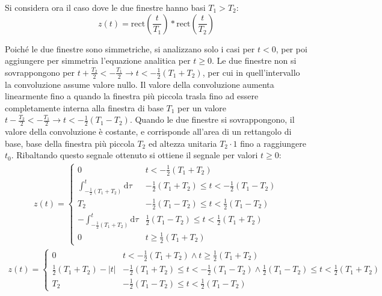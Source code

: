 \documentclass{article}
\newcommand{\rect}{\mathrm{rect}}
\newcommand{\df}{\mathrm{d}}
\begin{document}
Si considera ora il caso dove le due finestre hanno basi $T_1>T_2$:
\begin{equation*}
    z(t)=\rect\left(\displaystyle\frac{t}{T_1}\right)*\rect\left(\frac{t}{T_2}\right)
\end{equation*}

Poiché le due finestre sono simmetriche, si analizzano solo i casi per $t<0$, per poi aggiungere per simmetria l'equazione analitica per $t\geq0$. Le due finestre non si 
sovrappongono per $t+\displaystyle\frac{T_2}{2}<-\frac{T_1}{2}\to t<-\frac{1}{2}(T_1+T_2)$, per cui in quell'intervallo la convoluzione assume valore nullo. Il valore 
della convoluzione aumenta linearmente fino a quando la finestra più piccola trasla fino ad essere completamente interna alla finestra di base $T_1$ per un valore 
$t-\displaystyle\frac{T_2}{2}<-\frac{T_1}{2}\to t<-\frac{1}{2}(T_1-T_2)$. Quando le due finestre si sovrappongono, il valore della convoluzione è costante, e corrisponde 
all'area di un rettangolo di base, base della finestra più piccola $T_2$ ed altezza unitaria $T_2\cdot1$ fino a raggiungere $t_0$. Ribaltando questo segnale ottenuto 
si ottiene il segnale per valori $t\geq0$:
\begin{gather*}
    z(t)=\begin{cases}
        0&t<-\displaystyle\frac{1}{2}(T_1+T_2)\\
        \displaystyle\int_{-\frac{1}{2}(T_1+T_2)}^t\df\tau&-\frac{1}{2}(T_1+T_2)\leq t <-\frac{1}{2}(T_1-T_2)\\
        T_2&-\frac{1}{2}(T_1-T_2)\leq t<\frac{1}{2}(T_1-T_2)\\
        -\displaystyle\int_{-\frac{1}{2}(T_1+T_2)}^t\df\tau&\frac{1}{2}(T_1-T_2)\leq t <\frac{1}{2}(T_1+T_2)\\
        0&t\geq\displaystyle\frac{1}{2}(T_1+T_2)
    \end{cases}
\end{gather*}
\begin{gather}
    z(t)=\begin{cases}
        0&t<-\displaystyle\frac{1}{2}(T_1+T_2)\land t\geq\frac{1}{2}(T_1+T_2)\\
        \displaystyle\frac{1}{2}(T_1+T_2)-|t| &-\frac{1}{2}(T_1+T_2)\leq t <-\frac{1}{2}(T_1-T_2)\land \frac{1}{2}(T_1-T_2)\leq t <\frac{1}{2}(T_1+T_2)\\
        T_2&-\displaystyle\frac{1}{2}(T_1-T_2)\leq t<\frac{1}{2}(T_1-T_2)
    \end{cases}
\end{gather}
\end{document}
